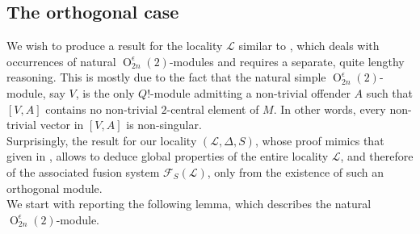 \documentclass{amsart}
\numberwithin{equation}{section}
\theoremstyle{definition}
\theoremstyle{subresult}
\theoremstyle{caseresult}
\newcommand{\F}{\mathcal{F}}
\renewcommand{\L}{\mathcal{L}}
\renewcommand{\O}{\operatorname{O}}
\newcommand{\<}{\langle}
\renewcommand{\>}{\rangle}
\begin{document}
\subsection{The orthogonal case}

We wish to produce a result for the locality $\L$ similar to \cite[Theorem C]{Meier-Stell-Stroth:2012}, which deals with occurrences of natural $\O^\epsilon_{2n}(2)$-modules and requires a separate, quite lengthy reasoning. This is mostly due to the fact that the natural simple $\O^\epsilon_{2n}(2)$-module, say $V$, is the only $Q!$-module admitting a non-trivial offender $A$ such that $[V,A]$ contains no non-trivial $2$-central element of $M$. In other words, every non-trivial vector in $[V,A]$ is non-singular.\\
Surprisingly, the result for our locality $(\L,\Delta,S)$, whose proof mimics that given in \cite{Meier-Stell-Stroth:2012}, allows to deduce global properties of the entire locality $\L$, and therefore of the associated fusion system $\F_S(\L)$, only from the existence of such an orthogonal module.\\
We start with reporting the following lemma, which describes the natural $\O^\epsilon_{2n}(2)$-module.
\end{document}
